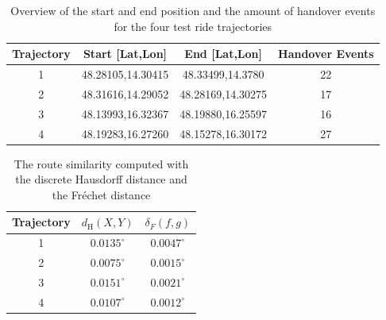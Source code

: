 \documentclass[twocolumn]{bmcart}%
\begin{document}
\begin{backmatter}
	\begin{table}[h]
		\caption{Overview of the start and end position and the amount of handover events for the four test ride trajectories}
		\begin{tabular}{|c|c|c|c|}
			\hline
			\textbf{Trajectory} & \textbf{Start [Lat,Lon]} & \textbf{End [Lat,Lon]} & \textbf{Handover Events} \\ \hline
			1                   & 48.28105,14.30415        & 48.33499,14.3780       & 22                       \\ %
			2                   & 48.31616,14.29052        & 48.28169,14.30275      & 17                       \\  %
			3                   & 48.13993,16.32367        & 48.19880,16.25597      & 16                       \\ %
			4                   & 48.19283,16.27260        & 48.15278,16.30172      & 27                       \\  \hline %
		\end{tabular}
		\label{table:tracks}
	\end{table}
	
	
	\begin{table}[h]
		\caption{The route similarity computed with the discrete Hausdorff distance and the Fr\'{e}chet distance}
		\begin{tabular}{|c|c|c|}
			\hline
			\textbf{Trajectory} & \textbf{$d_{\mathrm H}(X,Y)$ } & \textbf{$\delta_F(f,g)$} \\ \hline
			1                   & $0.0135^\circ$                 & $0.0047^\circ$           \\ %
			2                   & $0.0075^\circ$                 & $0.0015^\circ$           \\  %
			3                   & $0.0151^\circ$                 & $0.0021^\circ$           \\ %
			4                   & $0.0107^\circ$                 & $0.0012^\circ$           \\  \hline %
		\end{tabular}
		\label{table:routesim}
	\end{table}
	
	\begin{table}[h]
		

\end{table}
\end{backmatter}
\end{document}
